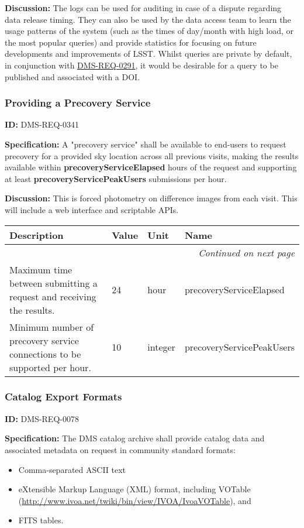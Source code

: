\documentclass[SE,toc,lsstdraft]{lsstdoc}
\makeatletter
\newcommand{\paramname}[1]{\hspace{0pt}#1}
\newcommand{\unitname}[1]{\hspace{0pt}#1}
\newenvironment{parameters}[0]{%
\setlength\LTleft{0pt}
\setlength\LTright{\fill}
\begin{small}
\begin{longtable}[]{|p{0.5\textwidth}|l|p{0.6in}|p{1.74in}@{}|}

\hline \textbf{Description} & \textbf{Value} & \textbf{Unit} & \textbf{Name} \\ \hline
\endhead

\hline \multicolumn{4}{r}{\emph{Continued on next page}} \\
\endfoot

\hline\hline
\endlastfoot
}{%
\hline
\end{longtable}
\end{small}
}
\makeatother
\begin{document}
    \textbf{Discussion: }The logs can be used for auditing in case of a dispute regarding data release timing. They can also be used by the data access team to learn the usage patterns of the system (such as the times of day/month with high load, or the most popular queries) and provide statistics for focusing on future developments and improvements of LSST. Whilst queries are private by default, in conjunction with \hyperref[DMS-REQ-0291]{DMS-REQ-0291}, it would be desirable for a query to be published and associated with a DOI.




\subsubsection{Providing a Precovery Service}

\label{DMS-REQ-0341}
\textbf{ID:} DMS-REQ-0341

\textbf{Specification:} A "precovery service" shall be available to end-users to request precovery for a provided sky location across all previous visits, making the results available within \textbf{precoveryServiceElapsed} hours of the request and supporting at least\textbf{ precoveryServicePeakUsers} submissions per hour.

\textbf{Discussion:} This is forced photometry on difference images from each visit. This will include a web interface and scriptable APIs.



\begin{parameters}
Maximum time between submitting a request and receiving the results.
&
24
&
\unitname{%
hour
}
&
\paramname{%
precoveryServiceElapsed
} \\\hline
Minimum number of precovery service connections to be supported per hour.
&
10
&
\unitname{%
integer
}
&
\paramname{%
precoveryServicePeakUsers
} \\\hline
\end{parameters}




\subsubsection{Catalog Export Formats}

\label{DMS-REQ-0078}
\textbf{ID:} DMS-REQ-0078

\textbf{Specification:} The DMS catalog archive shall provide catalog data and associated metadata on request in community standard formats:
\begin{itemize}
\item Comma-separated ASCII text
\item eXtensible Markup Language (XML) format, including VOTable
   (\url{http://www.ivoa.net/twiki/bin/view/IVOA/IvoaVOTable}), and
\item FITS tables.
\end{itemize}
\end{document}
